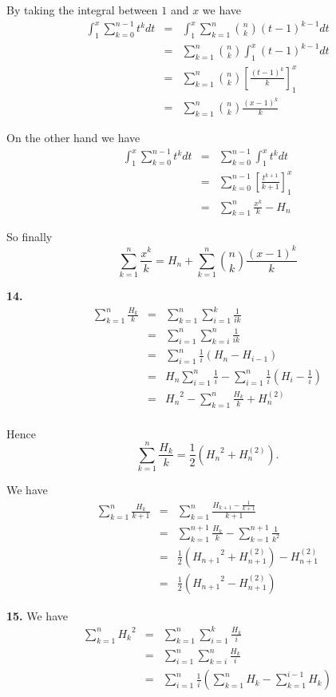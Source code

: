 \documentclass[a4paper,12pt]{article}
\newcommand{\newpar}[1]{\bigskip \noindent \textbf{#1.}}
\begin{document}
By taking the integral between $1$ and $x$ we have
\begin{eqnarray*}
  \int_1^x \sum_{k=0}^{n-1} t^k dt &=& \int_1^x \sum_{k=1}^n {n
    \choose k}(t-1)^{k-1} dt \\
  &=& \sum_{k=1}^n {n \choose k} \int_1^x (t - 1)^{k-1} dt \\
  &=& \sum_{k=1}^n {n \choose k} \left[ \frac{(t-1)^k}{k}\right]_1^x
\\
&=& \sum_{k=1}^n {n \choose k} \frac{(x-1)^k}{k}
\end{eqnarray*}

On the other hand we have
\begin{eqnarray*}
  \int_1^x \sum_{k=0}^{n-1} t^k dt &=& \sum_{k=0}^{n-1} \int_1^x t^k
  dt \\
  &=& \sum_{k=0}^{n-1} \left[\frac{t^{k+1}}{k+1}\right]_1^x \\
  &=& \sum_{k=1}^n \frac{x^k}{k} - H_n
\end{eqnarray*}

So finally
\[ \sum_{k=1}^n \frac{x^k}{k} = H_n + \sum_{k=1}^n {n \choose k}
\frac{(x-1)^k}{k}\]

\newpar{14}
\begin{eqnarray*}
  \sum_{k=1}^n \frac{H_k}{k} &=& \sum_{k=1}^n \sum_{i=1}^k
  \frac{1}{ik} \\
  &=& \sum_{i=1}^n \sum_{k=i}^n \frac{1}{ik} \\
  &=& \sum_{i=1}^n \frac{1}{i} (H_n - H_{i-1}) \\
  &=& H_n \sum_{i=1}^n \frac{1}{i} - \sum_{i=1}^n \frac{1}{i}\left( H_i -
  \frac{1}{i}\right) \\
  &=& {H_n}^2 - \sum_{k=1}^n \frac{H_k}{k} + H_n^{(2)} \\
\end{eqnarray*}

Hence
\[ \sum_{k=1}^n \frac{H_k}{k} = \frac{1}{2}\left({H_n}^2 +
H_n^{(2)}\right).\]

We have
\begin{eqnarray*}
  \sum_{k=1}^n \frac{H_k}{k+1} &=& \sum_{k=1}^n \frac{H_{k+1} -
    \frac{1}{k+1}}{k+1} \\
  &=& \sum_{k=1}^{n+1} \frac{H_k}{k}  -
  \sum_{k=1}^{n+1}\frac{1}{k^2} \\
  &=& \frac{1}{2} \left({H_{n+1}}^2 + H_{n+1}^{(2)}\right) -
  H_{n+1}^{(2)} \\
  &=& \frac{1}{2} \left({H_{n+1}}^2 - H_{n+1}^{(2)}\right)
\end{eqnarray*}

\newpar{15} We have
\begin{eqnarray*}
  \sum_{k=1}^n {H_k}^2 &=& \sum_{k=1}^n \sum_{i=1}^k \frac{H_k}{i} \\
  &=& \sum_{i=1}^n \sum_{k=i}^n \frac{H_k}{i} \\
  &=& \sum_{i=1}^n \frac{1}{i} \left(\sum_{k=1}^n H_k -
  \sum_{k=1}^{i-1}H_k\right)
\end{eqnarray*}
\end{document}

